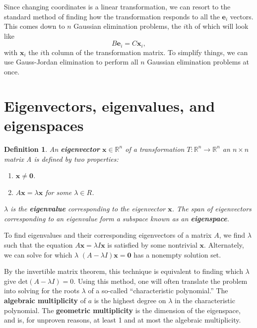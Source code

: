 \documentclass[draft,12pt]{report}
\newtheorem{definition}{Definition}
\renewcommand{\vec}[1]{\mathbf{#1}}
\begin{document}
Since changing coordinates is a linear transformation, we can resort to the standard method of finding how the transformation responds to all the $\vec{e}_i$ vectors. This comes down to $n$ Gaussian elimination problems, the $i$th of which will look like
\[ B\vec{e}_i = C\vec{x}_i, \]
with $\vec{x}_i$ the $i$th column of the transformation matrix. To simplify things, we can use Gauss-Jordan elimination to perform all $n$ Gaussian elimination problems at once.

\section{Eigenvectors, eigenvalues, and eigenspaces}

\begin{definition}
    An \textbf{eigenvector} $\vec{x} \in \mathbb R^n$ of a transformation $T : \mathbb R^n \rightarrow \mathbb R^n$ an $n \times n$ matrix A is defined by two properties:
    \begin{enumerate}
        \item[(1)] $\vec{x} \neq \vec{0}$.
        \item[(2)] $A\vec{x} = \lambda \vec{x}$ for some $\lambda \in R$.
    \end{enumerate}
    $\lambda$ is the \textbf{eigenvalue} corresponding to the eigenvector $\textbf{x}$. The span of eigenvectors corresponding to an eigenvalue form a subspace known as an \textbf{eigenspace}.
\end{definition}
\noindent
To find eigenvalues and their corresponding eigenvectors of a matrix $A$, we find $\lambda$ such that the equation $A\vec{x} = \lambda I\vec{x}$ is satisfied by some nontrivial $\vec{x}$. Alternately, we can solve for which $\lambda$ $(A - \lambda I)\vec{x} = \vec{0}$ has a nonempty solution set.

By the invertible matrix theorem, this technique is equivalent to finding which $\lambda$ give $\mathrm{det} (A - \lambda I) = 0$. Using this method, one will often translate the problem into solving for the roots $\lambda$ of a so-called ``characteristic polynomial.'' The \textbf{algebraic multiplicity} of $a$ is the highest degree on $\lambda$ in the characteristic polynomial. The \textbf{geometric multiplicity} is the dimension of the eigenspace, and is, for unproven reasons, at least 1 and at most the algebraic multiplicity.
\end{document}
